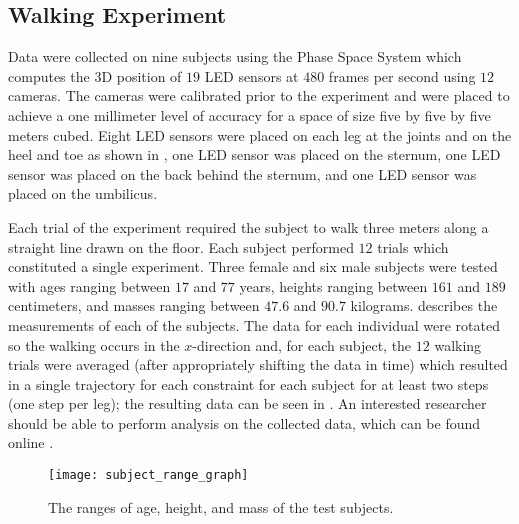 \subsection{Walking Experiment} Data were collected on nine subjects using the
Phase Space System \cite{phasespace} which computes the 3D position of $19$ LED sensors at $480$ frames per second using $12$ cameras. The cameras were calibrated prior to the experiment and were placed to achieve a one millimeter level of accuracy for a space of size five by five by five meters cubed. Eight LED sensors were placed on each leg at the joints and on the heel and toe as shown in , one LED sensor was placed on the sternum, one LED sensor was placed on the back behind the sternum, and one LED sensor was placed on the umbilicus.

Each trial of the experiment required the subject to walk three meters along a
straight line drawn on the floor. Each subject performed $12$ trials which
constituted a single experiment. Three female and six male subjects were tested
with ages ranging between $17$ and $77$ years, heights ranging between $161$ and
$189$ centimeters, and masses ranging between $47.6$ and $90.7$
kilograms.  describes the measurements of each of the
subjects. The data for each individual were rotated so the walking occurs in the
$x$-direction and, for each subject, the $12$ walking trials were averaged
(after appropriately shifting the data in time) which resulted in a single
trajectory for each constraint for each subject for at least two steps (one step
per leg); the resulting data can be seen in . An
interested researcher should be able to perform analysis on the collected data,
which can be found online \cite{ourdataset}.

\begin{figure}[t!]
  \centering
  \texttt{[image: subject\_range\_graph]}
  \caption{The ranges of age, height, and mass of the test subjects.}
  \label{fig:subject-ranges}
\end{figure}

